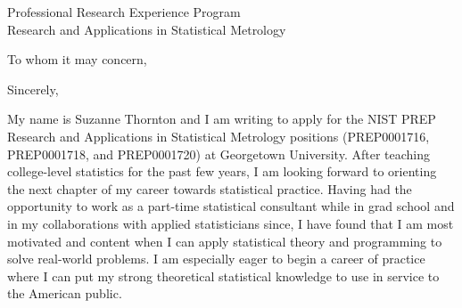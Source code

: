 \documentclass[11pt,a4paper,sans]{moderncv}
\begin{document}
	
	{Professional Research Experience Program\\
	Research and Applications in Statistical Metrology}
	\date{\today }
	\opening{To whom it may concern,}
	\closing{Sincerely,}
	\makelettertitle
	

	
	
	My name is Suzanne Thornton and I am writing to apply for the NIST PREP Research and Applications in Statistical Metrology positions (PREP0001716, PREP0001718, and PREP0001720) at Georgetown University. After teaching college-level statistics for the past few years, I am looking forward to orienting the next chapter of my career towards statistical practice. Having had the opportunity to work as a part-time statistical consultant while in grad school and in my collaborations with applied statisticians since, I have found that I am most motivated and content when I can apply statistical theory and programming to solve real-world problems. I am especially eager to begin a career of practice where I can put my strong theoretical statistical knowledge to use in service to the American public.\\ \vspace{2mm}
\end{document}
